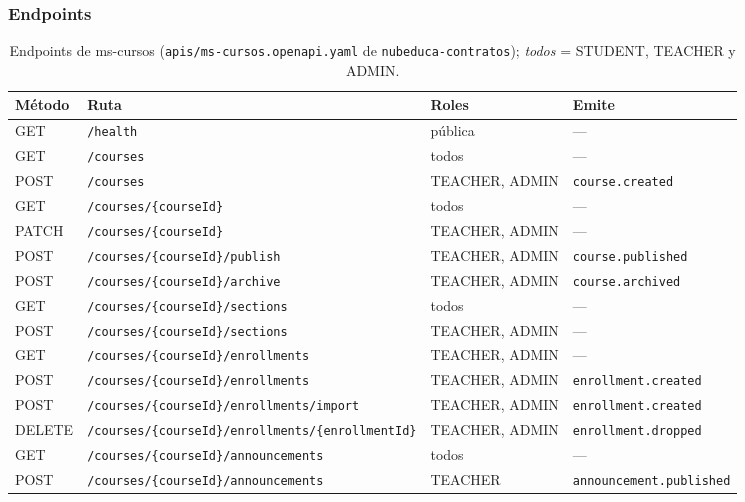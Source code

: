\subsubsection{Endpoints}
\begin{table}[htbp]
\centering\footnotesize
\begin{tabularx}{\textwidth}{lXll}
\toprule
Método & Ruta & Roles & Emite \\
\midrule
GET    & \texttt{/health} & pública & --- \\
GET    & \texttt{/courses} & todos & --- \\
POST   & \texttt{/courses} & TEACHER, ADMIN & \texttt{course.created} \\
GET    & \texttt{/courses/\{courseId\}} & todos & --- \\
PATCH  & \texttt{/courses/\{courseId\}} & TEACHER, ADMIN & --- \\
POST   & \texttt{/courses/\{courseId\}/publish} & TEACHER, ADMIN & \texttt{course.published} \\
POST   & \texttt{/courses/\{courseId\}/archive} & TEACHER, ADMIN & \texttt{course.archived} \\
GET    & \texttt{/courses/\{courseId\}/sections} & todos & --- \\
POST   & \texttt{/courses/\{courseId\}/sections} & TEACHER, ADMIN & --- \\
GET    & \texttt{/courses/\{courseId\}/enrollments} & TEACHER, ADMIN & --- \\
POST   & \texttt{/courses/\{courseId\}/enrollments} & TEACHER, ADMIN & \texttt{enrollment.created} \\
POST   & \texttt{/courses/\{courseId\}/enrollments/import} & TEACHER, ADMIN & \texttt{enrollment.created} \\
DELETE & \texttt{/courses/\{courseId\}/enrollments/\{enrollmentId\}} & TEACHER, ADMIN & \texttt{enrollment.dropped} \\
GET    & \texttt{/courses/\{courseId\}/announcements} & todos & --- \\
POST   & \texttt{/courses/\{courseId\}/announcements} & TEACHER & \texttt{announcement.published} \\
\bottomrule
\end{tabularx}
\caption{Endpoints de ms-cursos (\texttt{apis/ms-cursos.openapi.yaml} de \texttt{nubeduca-contratos}); \textit{todos} = STUDENT, TEACHER y ADMIN.}
\end{table}

